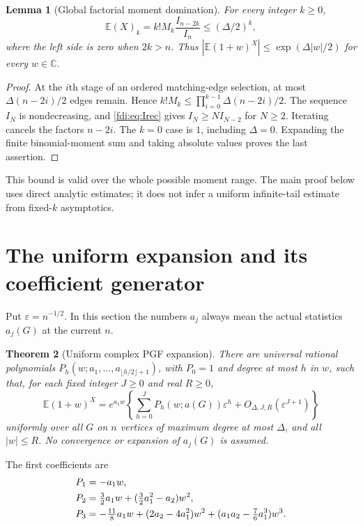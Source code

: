 \documentclass[11pt,letterpaper]{article}
\newtheorem{theorem}{Theorem}[section]
\newtheorem{lemma}[theorem]{Lemma}
\theoremstyle{remark}\newtheorem{remark}[theorem]{Remark}
\newcommand{\E}{\mathbb E}\newcommand{\Prb}{\mathbb P}\newcommand{\R}{\mathbb R}\newcommand{\C}{\mathbb C}
\newcommand{\eps}{\varepsilon}\newcommand{\Pois}{\operatorname{Poisson}}
\begin{document}
\begin{lemma}[Global factorial moment domination]\label{fdi:lem:factorial}
For every integer $k\ge0$,
\begin{equation}\label{fdi:eq:factorial}
 \E(X)_k=k!M_k\frac{I_{n-2k}}{I_n}\le(\Delta/2)^k,
\end{equation}
where the left side is zero when $2k>n$. Thus
$|\E(1+w)^X|\le\exp(\Delta|w|/2)$ for every $w\in\C$.
\end{lemma}
\begin{proof}
At the $i$th stage of an ordered matching-edge selection, at most $\Delta(n-2i)/2$ edges remain. Hence
$k!M_k\le\prod_{i=0}^{k-1}\Delta(n-2i)/2$.
The sequence $I_N$ is nondecreasing, and \eqref{fdi:eq:Irec} gives
$I_N\ge N I_{N-2}$ for $N\ge2$.
Iterating cancels the factors $n-2i$. The $k=0$ case is $1$, including $\Delta=0$. Expanding the finite binomial-moment sum and taking absolute values proves the last assertion.
\end{proof}
This bound is valid over the whole possible moment range. The main proof below uses direct analytic estimates; it does not infer a uniform infinite-tail estimate from fixed-$k$ asymptotics.

\section{The uniform expansion and its coefficient generator}\label{fdi:sec:uniform}
Put $\eps=n^{-1/2}$. In this section the numbers $a_j$ always mean the actual statistics $a_j(G)$ at the current $n$.

\begin{theorem}[Uniform complex PGF expansion]\label{fdi:thm:pgf}
There are universal rational polynomials
$P_h(w;a_1,\ldots,a_{\lfloor h/2\rfloor+1})$, with $P_0=1$ and degree at most $h$ in $w$, such that, for each fixed integer $J\ge0$ and real $R\ge0$,
\begin{equation}\label{fdi:eq:pgf}
 \E(1+w)^X=e^{a_1w}\left\{\sum_{h=0}^J P_h(w;a(G))\eps^h
 +O_{\Delta,J,R}(\eps^{J+1})\right\}
\end{equation}
uniformly over all $G$ on $n$ vertices of maximum degree at most $\Delta$, and all $|w|\le R$. No convergence or expansion of $a_j(G)$ is assumed.
\end{theorem}
The first coefficients are
\begin{align}
 P_1&=-a_1w,\notag\\
 P_2&=\tfrac32a_1w+(\tfrac32a_1^2-a_2)w^2,\label{fdi:eq:P123}\\
 P_3&=-\tfrac{11}{8}a_1w+(2a_2-4a_1^2)w^2
 +(a_1a_2-\tfrac76a_1^3)w^3.\notag
\end{align}
\end{document}
